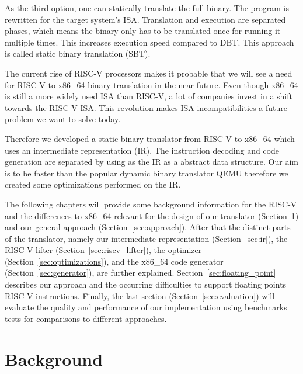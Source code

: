 \documentclass[course=eragp]{aspdoc}
\begin{document}
As the third option, one can statically translate the full binary. The program is rewritten for the
target system's ISA.
Translation and execution are separated phases, which means the binary only has to be translated once for
running it multiple times. This increases execution speed compared to DBT. This
approach is called static binary translation (SBT).~\cite{binary_translation}

\par

The current rise of RISC-V processors makes it probable that we will see a need for RISC-V to
x86\_64 binary translation in the near future. Even though x86\_64 is still a more widely used ISA
than RISC-V, a lot of companies invest in a shift towards the RISC-V ISA. This revolution makes ISA
incompatibilities a future problem we want to solve today.~\cite{riscv_rises}

\par

Therefore we developed a static binary translator from RISC-V to x86\_64 which uses an intermediate
representation (IR). The instruction decoding and code generation are separated by using as the IR
as a abstract data structure. Our aim is to be faster than the popular dynamic binary translator
QEMU therefore we created some optimizations performed on the IR.

\par

The following chapters will provide some background information for the RISC-V and the differences
to x86\_64 relevant for the design of our translator (Section~\ref{sec:background}) and our general
approach (Section~\ref{sec:approach}). After that the distinct parts of the translator, namely our
intermediate representation (Section~\ref{sec:ir}), the RISC-V lifter
(Section~\ref{sec:riscv_lifter}), the optimizer (Section~\ref{sec:optimizations}), and the x86\_64
code generator (Section~\ref{sec:generator}), are further explained.
Section~\ref{sec:floating_point} describes our approach and the occurring difficulties to support
floating points RISC-V instructions. Finally, the last section (Section~\ref{sec:evaluation}) will
evaluate the quality and performance of our implementation using benchmarks tests for comparisons to
different approaches.

\section{Background}\label{sec:background}
\end{document}
